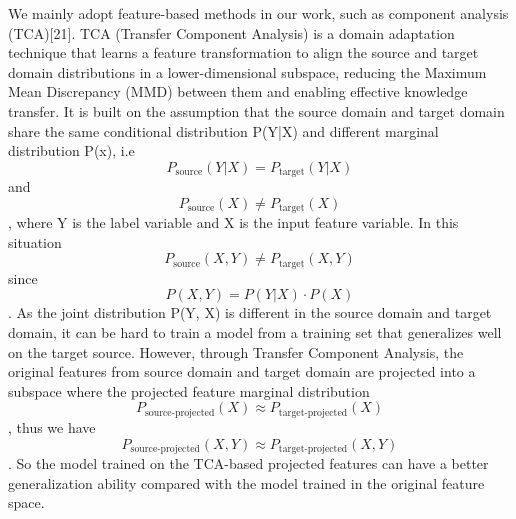 \documentclass[sigconf,final]{acmart}
\begin{document}
We mainly adopt feature-based methods in our work, such as component analysis (TCA)[21]. TCA (Transfer Component Analysis) is a domain adaptation technique that learns a feature transformation to align the source and target domain distributions in a lower-dimensional subspace, reducing the Maximum Mean Discrepancy (MMD) between them and enabling effective knowledge transfer. It is built on the assumption that the source domain and target domain share the same conditional distribution P(Y|X) and different marginal distribution P(x), i.e$$P_{\text{source}}(Y|X) = P_{\text{target}}(Y|X)$$ and $$P_{\text{source}}(X)\neq  P_{\text{target}}(X)$$, where Y is the label variable and X is the input feature variable. In this situation $$P_{\text{source}}(X,Y)\neq P_{\text{target}}(X,Y)$$ since $$P(X,Y)=P(Y|X)\cdot P(X)$$. As the joint distribution P(Y, X) is different in the source domain and target domain, it can be hard to train a model from a training set that generalizes well on the target source. However, through Transfer Component Analysis, the original features from source domain and target domain are projected into a subspace where the projected feature marginal distribution $$P_{\text{source-projected}}(X)\approx P_{\text{target-projected}}(X)$$, thus we have $$P_{\text{source-projected}}(X,Y)\approx P_{\text{target-projected}}(X,Y)$$. So the model trained on the TCA-based projected features can have a better generalization ability compared with the model trained in the original feature space.
\end{document}
